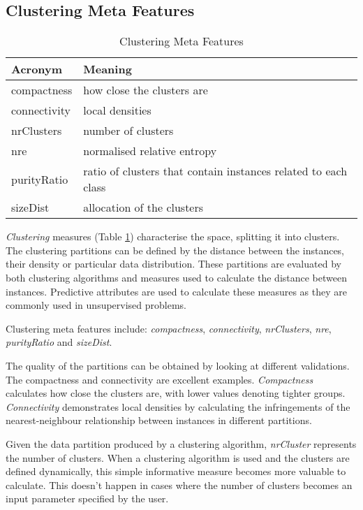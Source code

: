 \subsection{Clustering Meta Features}
\begin{table}[h!]
\centering
\caption{Clustering Meta Features}
	\setlength{\tabcolsep}{8pt}
	\renewcommand{\arraystretch}{1.2}
    \begin{tabular}{ll}
    \hline
    Acronym & Meaning \\ \hline
    compactness & how close the clusters are\\
    connectivity &  local densities\\
    nrClusters &  number of clusters\\
    nre &  normalised relative entropy\\
    purityRatio & ratio of clusters that contain instances related to each class\\
    sizeDist & allocation of the clusters\\
    \hline
    \end{tabular}
\label{tab:clustering-mf}
\end{table}
\textit{Clustering} measures (Table \ref{tab:clustering-mf}) characterise the space, splitting it into clusters.  The clustering partitions can be defined by the distance between the instances, their density or particular data distribution. These partitions are evaluated by both clustering algorithms and measures used to calculate the distance between instances. Predictive attributes are used to calculate these measures as they are commonly used in unsupervised problems. 

Clustering meta features include: \textit{compactness}, \textit{connectivity}, \textit{nrClusters}, \textit{nre}, \textit{purityRatio} and \textit{sizeDist}.

The quality of the partitions can be obtained by looking at different validations. The compactness and connectivity are excellent examples. \textit{Compactness} calculates how close the clusters are, with lower values denoting tighter groups. \textit{Connectivity} demonstrates local densities by calculating the infringements of the nearest-neighbour relationship between instances in different partitions.

Given the data partition produced by a clustering algorithm, \textit{nrCluster} represents the number of clusters. When a clustering algorithm is used and the clusters are defined dynamically, this simple informative measure becomes more valuable to calculate. This doesn't happen in cases where the number of clusters becomes an input parameter specified by the user.

